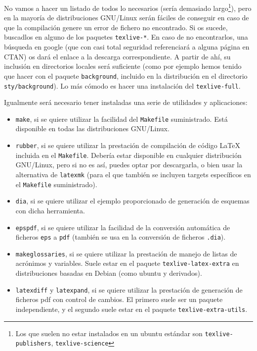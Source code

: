 No vamos a hacer un listado de todos lo necesarios (sería demasiado
largo\footnote{Los que suelen no estar instalados en un ubuntu estándar
  son \texttt{texlive-publishers}, \texttt{texlive-science}}), pero en
la mayoría de distribuciones GNU/Linux serán fáciles de conseguir en
caso de que la compilación genere un error de fichero no encontrado. Si
os sucede, buscadlos en alguno de los paquetes \texttt{texlive-*}. En
caso de no encontrarlos, una búsqueda en google (que con casi total
seguridad referenciará a alguna página en CTAN) os dará el enlace a la
descarga correspondiente. A partir de ahí, su inclusión en directorios
locales será suficiente (como por ejemplo hemos tenido que hacer con el
paquete \texttt{background}, incluido en la distribución en el
directorio \texttt{sty/background}). Lo más cómodo es hacer una
instalación del \texttt{texlive-full}. 

Igualmente será necesario tener instaladas una serie de utilidades y
aplicaciones:

\begin{itemize}
\item \texttt{make}, si se quiere utilizar la facilidad del
  \texttt{Makefile} suministrado. Está disponible en todas las
  distribuciones GNU/Linux.
\item \texttt{rubber}, si se quiere utilizar la prestación de
  compilación de código \LaTeX{} incluida en el
  \texttt{Makefile}. Debería estar disponible en cualquier distribución
  GNU/Linux, pero si no es así, puedes optar por descargarla, o bien
  usar la alternativa de \texttt{latexmk} (para el que también se
  incluyen targets específicos en el \texttt{Makefile} suministrado).
\item \texttt{dia}, si se quiere utilizar el ejemplo proporcionado de
  generación de esquemas con dicha herramienta.
\item \texttt{epspdf}, si se quiere utilizar la facilidad de la
  conversión automática de ficheros \texttt{eps} a \texttt{pdf} (también
  se usa en la conversión de ficheros \texttt{.dia}).
\item \texttt{makeglossaries}, si se quiere utilizar la prestación de
  manejo de listas de acrónimos y variables. Suele estar en el paquete
  \texttt{texlive-latex-extra} en distribuciones basadas en Debian
  (como ubuntu y derivados).
\item \texttt{latexdiff} y \texttt{latexpand}, si se quiere utilizar la
  prestación de generación de ficheros pdf con control de cambios. El
  primero suele ser un paquete independiente, y el segundo suele estar
  en el paquete \texttt{texlive-extra-utils}.
\end{itemize}


